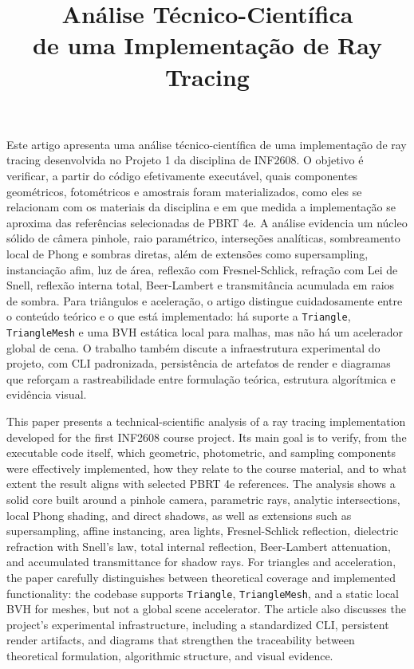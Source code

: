 \documentclass[portuguese]{sbcreviews-2025}%
\title[Análise Técnico-Científica de Ray Tracing]{Análise Técnico-Científica\\de uma Implementação de Ray Tracing}
\author[Yang Ricardo Barcellos Miranda]{
\affil{\textbf{Yang Ricardo Barcellos Miranda}~[\href{mailto:ymiranda@inf.puc-rio.br}{\nolinkurl{ymiranda@inf.puc-rio.br}}]}
}
\begin{document}
\hfuzz=70pt

\begin{frontmatter}

\maketitle

\begin{abstract-pt}
Este artigo apresenta uma análise técnico-científica de uma implementação de ray tracing desenvolvida no Projeto 1 da disciplina de INF2608. O objetivo é verificar, a partir do código efetivamente executável, quais componentes geométricos, fotométricos e amostrais foram materializados, como eles se relacionam com os materiais da disciplina e em que medida a implementação se aproxima das referências selecionadas de PBRT 4e. A análise evidencia um núcleo sólido de câmera pinhole, raio paramétrico, interseções analíticas, sombreamento local de Phong e sombras diretas, além de extensões como supersampling, instanciação afim, luz de área, reflexão com Fresnel-Schlick, refração com Lei de Snell, reflexão interna total, Beer-Lambert e transmitância acumulada em raios de sombra. Para triângulos e aceleração, o artigo distingue cuidadosamente entre o conteúdo teórico e o que está implementado: há suporte a \texttt{Triangle}, \texttt{TriangleMesh} e uma BVH estática local para malhas, mas não há um acelerador global de cena. O trabalho também discute a infraestrutura experimental do projeto, com CLI padronizada, persistência de artefatos de render e diagramas que reforçam a rastreabilidade entre formulação teórica, estrutura algorítmica e evidência visual.
\end{abstract-pt}

\begin{abstract-en}
This paper presents a technical-scientific analysis of a ray tracing implementation developed for the first INF2608 course project. Its main goal is to verify, from the executable code itself, which geometric, photometric, and sampling components were effectively implemented, how they relate to the course material, and to what extent the result aligns with selected PBRT 4e references. The analysis shows a solid core built around a pinhole camera, parametric rays, analytic intersections, local Phong shading, and direct shadows, as well as extensions such as supersampling, affine instancing, area lights, Fresnel-Schlick reflection, dielectric refraction with Snell's law, total internal reflection, Beer-Lambert attenuation, and accumulated transmittance for shadow rays. For triangles and acceleration, the paper carefully distinguishes between theoretical coverage and implemented functionality: the codebase supports \texttt{Triangle}, \texttt{TriangleMesh}, and a static local BVH for meshes, but not a global scene accelerator. The article also discusses the project's experimental infrastructure, including a standardized CLI, persistent render artifacts, and diagrams that strengthen the traceability between theoretical formulation, algorithmic structure, and visual evidence.
\end{abstract-en}


\end{frontmatter}
\end{document}
